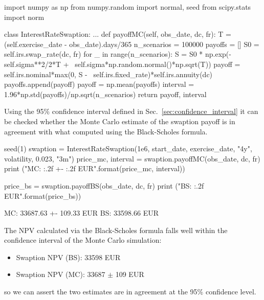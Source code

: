 \begin{ipython}
import numpy as np
from numpy.random import normal, seed
from scipy.stats import norm 

class InterestRateSwaption:
    ...
    def payoffMC(self, obs_date, dc, fr):
        T = (self.exercise_date - obs_date).days/365
        n_scenarios = 100000
        payoffs = []
        S0 = self.irs.swap_rate(dc, fr)
        for _ in range(n_scenarios):
            S = S0 * np.exp(-self.sigma**2/2*T + \
                            self.sigma*np.random.normal()*np.sqrt(T))
            payoff = self.irs.nominal*max(0, S - \
                                          self.irs.fixed_rate)*self.irs.annuity(dc)
            payoffs.append(payoff)
        payoff = np.mean(payoffs)
        interval = 1.96*np.std(payoffs)/np.sqrt(n_scenarios)
        return payoff, interval
\end{ipython}

Using the 95\% confidence interval defined in Sec.~\ref{sec:confidence_interval} it can be checked whether the Monte Carlo estimate of the swaption payoff is in agreement with what computed using the Black-Scholes formula.

\begin{ipython}
seed(1)
swaption = InterestRateSwaption(1e6, start_date, exercise_date, "4y",
                                volatility, 0.023, "3m")
price_mc, interval = swaption.payoffMC(obs_date, dc, fr)
print ("MC: {:.2f} +- {:.2f} EUR".format(price_mc, interval))

price_bs = swaption.payoffBS(obs_date, dc, fr)
print ("BS: {:.2f} EUR".format(price_bs))
\end{ipython}
\begin{ioutput}
MC: 33687.63 +- 109.33 EUR
BS: 33598.66 EUR
\end{ioutput}

The NPV calculated via the Black-Scholes formula falls well within the confidence interval of the Monte Carlo simulation:

\begin{itemize}
\tightlist
\item Swaption NPV (BS): 33598 EUR
\item Swaption NPV (MC): 33687 $\pm$ 109 EUR
\end{itemize}
so we can assert the two estimates are in agreement at the 95\% confidence level.

%

